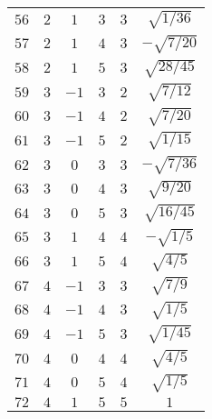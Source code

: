\begin{table}
\begin{center}
\begin{tabular}{|c|c|c|c|c|c|}
$56$ & $2$ & $1$ & $3$ & $3$ & $\sqrt{1/36}$ \\ 
$57$ & $2$ & $1$ & $4$ & $3$ & $-\sqrt{7/20}$ \\ 
$58$ & $2$ & $1$ & $5$ & $3$ & $\sqrt{28/45}$ \\ 
$59$ & $3$ & $-1$ & $3$ & $2$ & $\sqrt{7/12}$ \\ 
$60$ & $3$ & $-1$ & $4$ & $2$ & $\sqrt{7/20}$ \\ 
$61$ & $3$ & $-1$ & $5$ & $2$ & $\sqrt{1/15}$ \\ 
$62$ & $3$ & $0$ & $3$ & $3$ & $-\sqrt{7/36}$ \\ 
$63$ & $3$ & $0$ & $4$ & $3$ & $\sqrt{9/20}$ \\ 
$64$ & $3$ & $0$ & $5$ & $3$ & $\sqrt{16/45}$ \\ 
$65$ & $3$ & $1$ & $4$ & $4$ & $-\sqrt{1/5}$ \\ 
$66$ & $3$ & $1$ & $5$ & $4$ & $\sqrt{4/5}$ \\ 
$67$ & $4$ & $-1$ & $3$ & $3$ & $\sqrt{7/9}$ \\ 
$68$ & $4$ & $-1$ & $4$ & $3$ & $\sqrt{1/5}$ \\ 
$69$ & $4$ & $-1$ & $5$ & $3$ & $\sqrt{1/45}$ \\ 
$70$ & $4$ & $0$ & $4$ & $4$ & $\sqrt{4/5}$ \\ 
$71$ & $4$ & $0$ & $5$ & $4$ & $\sqrt{1/5}$ \\ 
$72$ & $4$ & $1$ & $5$ & $5$ & $1$ \\ 
\hline 
\end{tabular}
\end{center}
\end{table}

